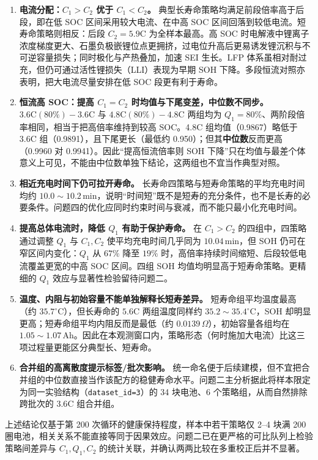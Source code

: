 \begin{enumerate}
  \item \textbf{电流分配：\(C_1>C_2\) 优于 \(C_1<C_2\)。}
  典型长寿命策略均满足前段倍率高于后段，即在低 SOC 区间采用较大电流、在中高 SOC 区间回落到较低电流。短寿命策略则相反：后段 \(C_2=5.9\mathrm{C}\) 为全样本最高。高 SOC 时电解液中锂离子浓度梯度更大、石墨负极嵌锂位点更拥挤，过电位升高后更易诱发锂沉积与不可逆容量损失；同时极化与产热叠加，加速 SEI 生长\cite{liu2019fastcharging,ahmed2017enabling}。LFP 体系虽相对耐过充，但仍可通过活性锂损失（LLI）表现为早期 SOH 下降\cite{dubarry2009lfp}。多段恒流对照亦表明，把大电流尽量安排在低 SOC 段更有利于寿命\cite{ma2024mcc}。
  \item \textbf{恒流高 SOC：提高 \(C_1=C_2\) 时均值与下尾变差，中位数不同步。}
  \(3.6\mathrm{C}(80\%)-3.6\mathrm{C}\) 与 \(4.8\mathrm{C}(80\%)-4.8\mathrm{C}\) 两组均为 \(Q_1=80\%\)、两阶段倍率相同，相当于把高倍率维持到较高 SOC。4.8C 组均值（0.9867）略低于 3.6C 组（0.9891），且下尾更长（最低约 0.950）；但其\textbf{中位数}反而更高（0.9960 对 0.9941）。因此“提高恒流倍率则 SOH 下降”只在均值与最差个体意义上可见，不能由中位数单独下结论，这两组也不宜当作典型对照。
  \item \textbf{相近充电时间下仍可拉开寿命。}
  长寿命四策略与短寿命策略的平均充电时间均约 \(10.0\sim 10.2\)\,min，说明“时间短”既不是短寿的充分条件，也不是长寿的必要条件。问题四的优化应同时约束时间与衰减，而不能只最小化充电时间。
  \item \textbf{提高总体电流时，降低 \(Q_1\) 有助于保护寿命。}
  在 \(C_1>C_2\) 的四组中，四策略通过调整 \(Q_1\) 与 \(C_1,C_2\) 使平均充电时间几乎同为 \(10.04\)\,min，但 SOH 仍可在窄区间内变化：\(Q_1\) 从 \(67\%\) 降至 \(19\%\) 时，高倍率持续时间缩短、后段较低电流覆盖更宽的中高 SOC 区间。四组 SOH 均值均明显高于短寿命策略。更精细的 \(Q_1\) 效应与显著性检验留待问题二。
  \item \textbf{温度、内阻与初始容量不能单独解释长短寿差异。}
  短寿命组平均温度最高（约 \(35.7^\circ\mathrm{C}\)），但长寿命的 \(5.6\mathrm{C}\) 两组温度同样约 \(35.2\sim 35.4^\circ\mathrm{C}\)，SOH 却明显更高；短寿命组平均内阻反而是最低（约 \(0.0139\,\Omega\)），初始容量各组均在 \(1.05\sim 1.07\)\,Ah。因此在本观测窗口内，策略形态（何时施加大电流）比这三项过程量更能区分典型长、短寿命。
  \item \textbf{合并组的高离散度提示标签/批次影响。}
  统一命名便于后续建模，但不宜把合并组的中位数直接当作该配方的稳健寿命水平。问题二主分析据此将样本限定为同一实验结构（\texttt{dataset\_id=3}）的 34 块电池、6 个策略组，从而自然排除跨批次的 \(3.6\mathrm{C}\) 组合并组。
\end{enumerate}

上述结论仅基于第 200 次循环的健康保持程度，样本中若干策略仅 2--4 块满 200 圈电池，相关关系不能直接等同于因果效应。问题二已在更严格的可比队列上检验策略间差异与 \(C_1,Q_1,C_2\) 的统计关联，并确认两两比较在多重校正后并不显著。

\FloatBarrier
